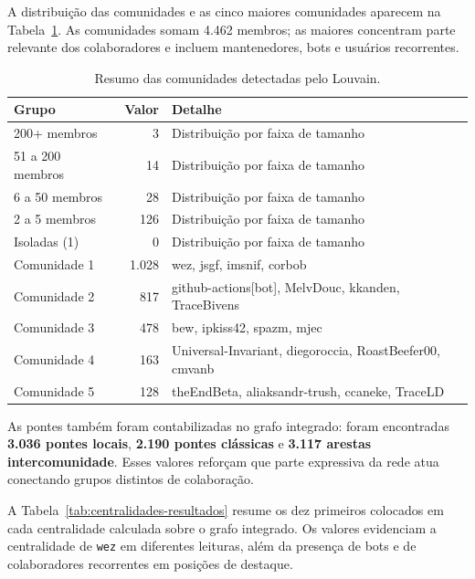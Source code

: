 \documentclass[12pt]{article}
\begin{document}
A distribuição das comunidades e as cinco maiores comunidades aparecem na
Tabela~\ref{tab:comunidades-resultados}. As comunidades somam 4.462 membros; as
maiores concentram parte relevante dos colaboradores e incluem mantenedores,
bots e usuários recorrentes.

\begin{table}[ht]
\centering
\caption{Resumo das comunidades detectadas pelo Louvain.}
\label{tab:comunidades-resultados}
\scriptsize
\renewcommand{\arraystretch}{0.85}
\begin{tabularx}{\textwidth}{lr>{\raggedright\arraybackslash}X}
\toprule
\textbf{Grupo} & \textbf{Valor} & \textbf{Detalhe} \\
\midrule
200+ membros & 3 & Distribuição por faixa de tamanho \\
51 a 200 membros & 14 & Distribuição por faixa de tamanho \\
6 a 50 membros & 28 & Distribuição por faixa de tamanho \\
2 a 5 membros & 126 & Distribuição por faixa de tamanho \\
Isoladas (1) & 0 & Distribuição por faixa de tamanho \\
Comunidade 1 & 1.028 & wez, jsgf, imsnif, corbob \\
Comunidade 2 & 817 & github-actions[bot], MelvDouc, kkanden, TraceBivens \\
Comunidade 3 & 478 & bew, ipkiss42, spazm, mjec \\
Comunidade 4 & 163 & Universal-Invariant, diegoroccia, RoastBeefer00, cmvanb \\
Comunidade 5 & 128 & theEndBeta, aliaksandr-trush, ccaneke, TraceLD \\
\bottomrule
\end{tabularx}
\end{table}

As pontes também foram contabilizadas no grafo integrado: foram encontradas
\textbf{3.036 pontes locais}, \textbf{2.190 pontes clássicas} e \textbf{3.117
arestas intercomunidade}. Esses valores reforçam que parte expressiva da rede
atua conectando grupos distintos de colaboração.

A Tabela~\ref{tab:centralidades-resultados} resume os dez primeiros colocados em
cada centralidade calculada sobre o grafo integrado. Os valores evidenciam a
centralidade de \texttt{wez} em diferentes leituras, além da presença de bots e
de colaboradores recorrentes em posições de destaque.
\end{document}
